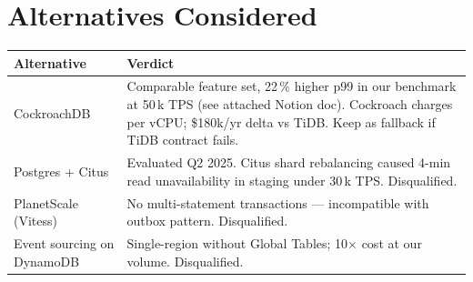 \section{Alternatives Considered}

\begin{tabularx}{\linewidth}{@{}K@{\hspace{6mm}}V@{}}
\toprule
Alternative & Verdict \\
\midrule
CockroachDB & Comparable feature set, 22\,\% higher p99 in our benchmark at 50\,k TPS (see attached Notion doc). Cockroach charges per vCPU; \$180k/yr delta vs TiDB. Keep as fallback if TiDB contract fails. \\
Postgres + Citus & Evaluated Q2 2025. Citus shard rebalancing caused 4-min read unavailability in staging under 30\,k TPS. Disqualified. \\
PlanetScale (Vitess) & No multi-statement transactions — incompatible with outbox pattern. Disqualified. \\
Event sourcing on DynamoDB & Single-region without Global Tables; 10$\times$ cost at our volume. Disqualified. \\
\bottomrule
\end{tabularx}

